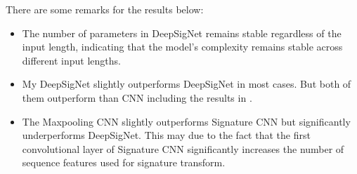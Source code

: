 \documentclass[]{article}
\renewcommand{\(}{\left(}
\renewcommand{\)}{\right)}
\begin{document}
	There are some remarks for the results below:
	\begin{itemize}
		\item The number of parameters in DeepSigNet remains stable regardless of the input length, indicating that the model's complexity remains stable across different input lengths.
		\item My DeepSigNet slightly outperforms DeepSigNet in most cases. But both of them outperform than CNN including the results in \cite{stone_2020}.
		\item The Maxpooling CNN slightly outperforms Signature CNN but significantly underperforms DeepSigNet. This may due to the fact that the first convolutional layer of Signature CNN significantly increases the number of sequence features used for signature transform.
	\end{itemize}
\end{document}
